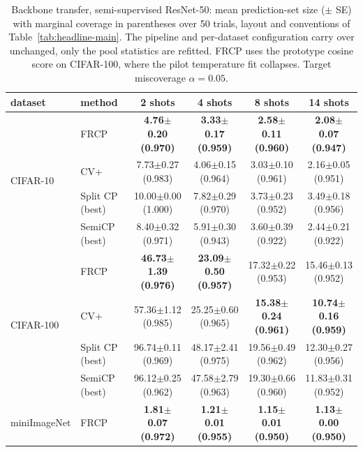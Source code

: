 \begin{table}[t]
\centering
\small
\caption{Backbone transfer, semi-supervised ResNet-50: mean prediction-set size ($\pm$ SE) with marginal coverage in parentheses over 50 trials, layout and conventions of Table~\ref{tab:headline-main}. The pipeline and per-dataset configuration carry over unchanged, only the pool statistics are refitted. FRCP uses the prototype cosine score on CIFAR-100, where the pilot temperature fit collapses. Target miscoverage $\alpha=0.05$.}
\label{tab:backbone-resnet50-a005}
\begin{tabular}{llcccc}
\toprule
dataset & method & 2 shots & 4 shots & 8 shots & 14 shots\\
\midrule
\multirow{4}{*}{CIFAR-10} & FRCP & \textbf{4.76$\pm$0.20 {\scriptsize(0.970)}} & \textbf{3.33$\pm$0.17 {\scriptsize(0.959)}} & \textbf{2.58$\pm$0.11 {\scriptsize(0.960)}} & \textbf{2.08$\pm$0.07 {\scriptsize(0.947)}}\\
 & CV+ & 7.73$\pm$0.27 {\scriptsize(0.983)} & 4.06$\pm$0.15 {\scriptsize(0.964)} & 3.03$\pm$0.10 {\scriptsize(0.961)} & 2.16$\pm$0.05 {\scriptsize(0.951)}\\
 & Split CP (best) & 10.00$\pm$0.00 {\scriptsize(1.000)} & 7.82$\pm$0.29 {\scriptsize(0.970)} & 3.73$\pm$0.23 {\scriptsize(0.952)} & 3.49$\pm$0.18 {\scriptsize(0.956)}\\
 & SemiCP (best) & 8.40$\pm$0.32 {\scriptsize(0.971)} & 5.91$\pm$0.30 {\scriptsize(0.943)} & 3.60$\pm$0.39 {\scriptsize(0.922)} & 2.44$\pm$0.21 {\scriptsize(0.922)}\\
\midrule
\multirow{4}{*}{CIFAR-100} & FRCP & \textbf{46.73$\pm$1.39 {\scriptsize(0.976)}} & \textbf{23.09$\pm$0.50 {\scriptsize(0.957)}} & 17.32$\pm$0.22 {\scriptsize(0.953)} & 15.46$\pm$0.13 {\scriptsize(0.952)}\\
 & CV+ & 57.36$\pm$1.12 {\scriptsize(0.985)} & 25.25$\pm$0.60 {\scriptsize(0.965)} & \textbf{15.38$\pm$0.24 {\scriptsize(0.961)}} & \textbf{10.74$\pm$0.16 {\scriptsize(0.959)}}\\
 & Split CP (best) & 96.74$\pm$0.11 {\scriptsize(0.969)} & 48.17$\pm$2.41 {\scriptsize(0.975)} & 19.56$\pm$0.49 {\scriptsize(0.962)} & 12.30$\pm$0.27 {\scriptsize(0.956)}\\
 & SemiCP (best) & 96.12$\pm$0.25 {\scriptsize(0.962)} & 47.58$\pm$2.79 {\scriptsize(0.963)} & 19.30$\pm$0.66 {\scriptsize(0.960)} & 11.83$\pm$0.31 {\scriptsize(0.952)}\\
\midrule
\multirow{4}{*}{miniImageNet} & FRCP & \textbf{1.81$\pm$0.07 {\scriptsize(0.972)}} & \textbf{1.21$\pm$0.01 {\scriptsize(0.955)}} & \textbf{1.15$\pm$0.01 {\scriptsize(0.950)}} & \textbf{1.13$\pm$0.00 {\scriptsize(0.950)}}\\

\end{tabular}
\end{table}
